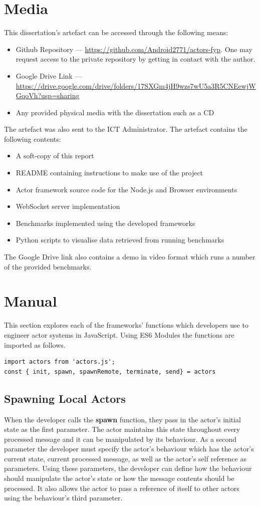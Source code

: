 \documentclass[oneside]{um-fict}
\begin{document}
\appendix
\chapter{Media}\label{appendix:media}
This dissertation's artefact can be accessed through the following means:
\begin{itemize}
\item Github Repository --- \url{https://github.com/Android2771/actors-fyp}. One may request access to the private repository by getting in contact with the author.
\item Google Drive Link --- \url{https://drive.google.com/drive/folders/17SXGm4jH9wzs7wU5a3R5CNEewjWGqoVh?usp=sharing}
\item Any provided physical media with the dissertation such as a CD
\end{itemize}

The artefact was also sent to the ICT Administrator. The artefact contains the following contents:
\begin{itemize}
\item A soft-copy of this report
\item README containing instructions to make use of the project
\item Actor framework source code for the Node.js and Browser environments
\item WebSocket server implementation
\item Benchmarks implemented using the developed frameworks
\item Python scripts to visualise data retrieved from running benchmarks
\end{itemize}

The Google Drive link also contains a demo in video format which runs a number of the provided benchmarks.
\chapter{Manual}\label{appendix:manual}
This section explores each of the frameworks' functions which developers use to engineer actor systems in JavaScript. Using ES6 Modules the functions are imported as follows.
\begin{lstlisting}
import actors from 'actors.js';
const { init, spawn, spawnRemote, terminate, send} = actors
\end{lstlisting}
\section{Spawning Local Actors}
When the developer calls the \textbf{spawn} function, they pass in the actor's initial state as the first parameter. The actor maintains this state throughout every processed message and it can be manipulated by its behaviour. As a second parameter the developer must specify the actor's behaviour which has the actor's current state, current processed message, as well as the actor's self reference as parameters. Using these parameters, the developer can define how the behaviour should manipulate the actor's state or how the message contents should be processed. It also allows the actor to pass a reference of itself to other actors using the behaviour's third parameter.
\end{document}
